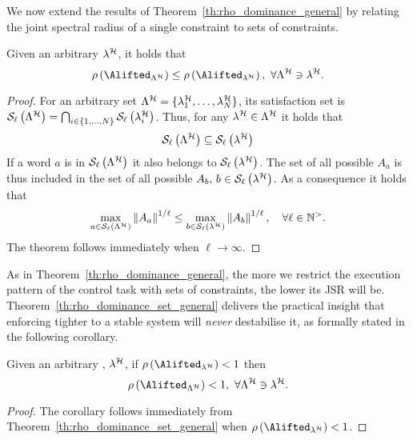 We now extend the results of Theorem~\ref{th:rho_dominance_general} by relating the joint spectral radius of a single constraint to sets of constraints.
\begin{theorem}%
    \label{th:rho_dominance_set_general}%
    Given an arbitrary \ewhc{} $\lambda^{\mathcal{H}}$, it holds that
    \begin{equation*}
        \rho\left(\Alifted_{\Lambda^\strat}\right) \leq \rho \left( \Alifted_{\lambda^\strat} \right) ,\,\, \forall \Lambda^\strat \ni \lambda^\strat.
    \end{equation*}
    \begin{proof}
        For an arbitrary \ewhc{} set $\Lambda^{\mathcal{H}} = \{\lambda^{\mathcal{H}}_1, \dots, \lambda^{\mathcal{H}}_N\}$, its satisfaction set is $\mathcal{S}_{\ell}\left( \Lambda^{\mathcal{H}} \right) = \bigcap_{i \in \{1,\dots, N\}} \mathcal{S}_{\ell}\left( \lambda^{\mathcal{H}}_i \right)$.
        Thus, for any $\lambda^{\mathcal{H}} \in \Lambda^{\mathcal{H}}$ it holds that 
        \begin{equation*}
            \mathcal{S}_{\ell}\left( \Lambda^{\mathcal{H}} \right) \subseteq \mathcal{S}_{\ell}\left( \lambda^{\mathcal{H}} \right)
        \end{equation*}
        If a word $a$ is in $\mathcal{S}_{\ell}\left( \Lambda^{\mathcal{H}} \right)$ it also belongs to $\mathcal{S}_{\ell}\left( \lambda^{\mathcal{H}} \right)$. 
        The set of all possible $A_{a}$ is thus included in the set of all possible $A_{b},\, b \in \mathcal{S}_{\ell}\left( \lambda^{\mathcal{H}} \right)$.
        As a consequence it holds that
        \begin{equation*}
            \max_{a \in \mathcal{S}_{\ell}\left( \Lambda^{\mathcal{H}}  \right)} \left\lVert A_{a}\right\rVert^{1/\ell} \leq
            \max_{b \in \mathcal{S}_{\ell}\left( \lambda^{\mathcal{H}}  \right)} \left\lVert A_{b}\right\rVert^{1/\ell}, \quad
            \forall \ell\in\mathbb{N}^{>}.
        \end{equation*}
        The theorem follows immediately when $\ell\rightarrow \infty$.
    \end{proof}
\end{theorem}

As in Theorem~\ref{th:rho_dominance_general}, the more we restrict the execution pattern of the control task with sets of constraints, the lower its JSR will be.
Theorem~\ref{th:rho_dominance_set_general} delivers the practical insight that enforcing tighter \ewhc{} to a stable system will \emph{never} destabilise it, as formally stated in the following corollary.
\begin{corollary}%
    \label{cor:rho_dominance_set}%
    Given an arbitrary \ewhc{}, $\lambda^{\mathcal{H}}$, if $\rho \left( \Alifted_{\lambda^\strat} \right) < 1$ then
    \begin{equation*}
        \rho\left(\Alifted_{\Lambda^\strat}\right) < 1 ,\,\, \forall \Lambda^\strat \ni \lambda^\strat.
    \end{equation*}

    \begin{proof}
        The corollary follows immediately from Theorem~\ref{th:rho_dominance_set_general} when $\rho \left( \Alifted_{\lambda^\strat} \right) < 1$.
    \end{proof}
\end{corollary}
